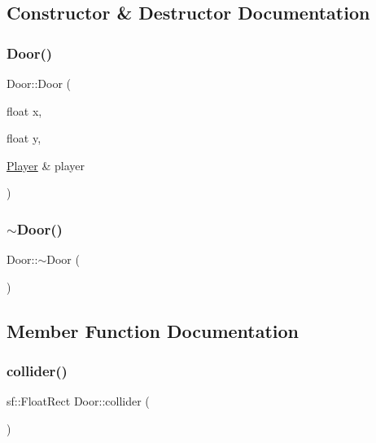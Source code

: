 \subsection{Constructor \& Destructor Documentation}
\mbox{\label{class_door_a7645be7f8752d419f8d2d5734eaa7ebd}} 
\subsubsection{\texorpdfstring{Door()}{Door()}}
{\footnotesize\ttfamily Door\+::\+Door (\begin{DoxyParamCaption}\item[{float}]{x,  }\item[{float}]{y,  }\item[{\mbox{\hyperlink{class_player}{Player}} \&}]{player }\end{DoxyParamCaption})}

\mbox{\label{class_door_a3dbbbd7a49698a8461d3c22df60bd2d3}} 
\subsubsection{\texorpdfstring{$\sim$Door()}{~Door()}}
{\footnotesize\ttfamily Door\+::$\sim$\+Door (\begin{DoxyParamCaption}{ }\end{DoxyParamCaption})}



\subsection{Member Function Documentation}
\mbox{\label{class_door_a981d32d899bf7bf19833bce9e47364a1}} 
\subsubsection{\texorpdfstring{collider()}{collider()}}
{\footnotesize\ttfamily sf\+::\+Float\+Rect Door\+::collider (\begin{DoxyParamCaption}{ }\end{DoxyParamCaption})\hspace{0.3cm}{\ttfamily [inline]}}

